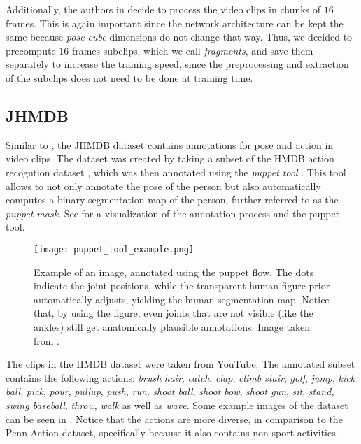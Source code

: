 Additionally, the authors in \cite{luvizon_2d/3d_2018} decide to process the video clips in chunks of $16$ frames.
This is again important since the network architecture can be kept the same because \textit{pose cube} dimensions do not change that way.
Thus, we decided to precompute $16$ frames subclips, which we call \textit{fragments}, and save them separately to increase the training speed, since the preprocessing and extraction of the subclips does not need to be done at training time. 

\subsection{JHMDB}
\label{sec:exp-jhmdb}

Similar to \cite{zhang_actemes_2013} , the JHMDB dataset \cite{jhuang_towards_2013} contains annotations for pose and action in video clips.
The dataset was created by taking a subset of the HMDB action recogntion dataset \cite{kuehne_hmdb:_2011}, which was then annotated using the \textit{puppet tool} \cite{zuffi_pictorial_2012}.
This tool allows to not only annotate the pose of the person but also automatically computes a binary segmentation map of the person, further referred to as the \textit{puppet mask}.
See  for a visualization of the annotation process and the puppet tool.

\begin{figure}[htb!]
    \centering
    \texttt{[image: puppet\_tool\_example.png]}
    \caption{Example of an image, annotated using the puppet flow. The dots indicate the joint positions, while the transparent human figure prior automatically adjusts, yielding the human segmentation map. Notice that, by using the figure, even joints that are not visible (like the ankles) still get anatomically plausible annotations. Image taken from \cite{noauthor_jhmdb_nodate}.}
    \label{fig:puppet_tool_example}
\end{figure}

The clips in the HMDB dataset were taken from YouTube.
The annotated subset contains the following actions:
\textit{brush hair}, \textit{catch}, \textit{clap}, \textit{climb stair}, \textit{golf}, \textit{jump}, \textit{kick ball}, \textit{pick}, \textit{pour}, \textit{pullup}, \textit{push}, \textit{run}, \textit{shoot ball}, \textit{shoot bow}, \textit{shoot gun}, \textit{sit}, \textit{stand}, \textit{swing baseball}, \textit{throw}, \textit{walk} as well as \textit{wave}.
Some example images of the dataset can be seen in .
Notice that the actions are more diverse, in comparison to the Penn Action dataset, specifically because it also contains non-sport activities.

